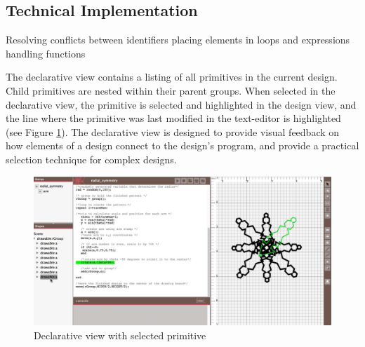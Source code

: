 \documentclass{sigchi}
\begin{document}
 

\subsection{Technical Implementation}
Resolving conflicts between identifiers
placing elements in loops and expressions
handling functions


The declarative view contains a listing of all primitives in the current design. Child primitives are nested within their parent groups. When selected in the declarative view, the primitive is selected and highlighted in the design view, and the line where the primitive was last modified in the text-editor is highlighted (see Figure \ref{fig:declarative_view}). The declarative view is designed to provide visual feedback on how elements of a design connect to the design's program, and provide a practical selection technique for complex designs.

\begin{center}
\begin{figure}[h!]
\includegraphics[width=\columnwidth]{images/selection_mechanism.jpg}
\caption{Declarative view with selected primitive}
\label{fig:declarative_view}
\end{figure}
\end{center}
\vspace{-20pt}
\end{document}
